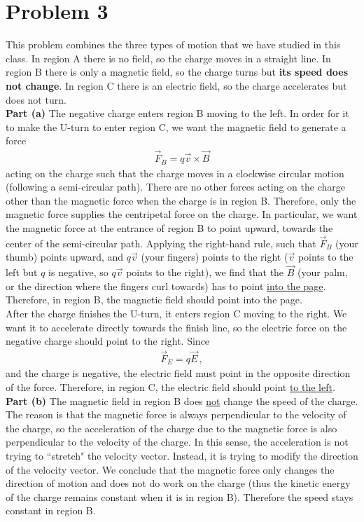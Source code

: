 \documentclass[11pt]{article}
\begin{document}
\newpage
\section*{Problem 3}
This problem combines the three types of motion that we have studied in this class. In region A there is no field, so the charge moves in a straight line. In region B there is only a magnetic field, so the charge turns but \textbf{its speed does not change}. In region C there is an electric field, so the charge accelerates but does not turn.\\

\noindent\textbf{Part (a)} The negative charge enters region B moving to the left. In order for it to make the U-turn to enter region C, we want the magnetic field to generate a force 
\begin{align*}
\vec{F}_B = q\vec{v}\times \vec{B}
\end{align*}
acting on the charge such that the charge moves in a clockwise circular motion (following a semi-circular path). There are no other forces acting on the charge other than the magnetic force when the charge is in region B. Therefore, only the magnetic force supplies the centripetal force on the charge. In particular, we want the magnetic force at the entrance of region B to point upward, towards the center of the semi-circular path. Applying the right-hand rule, such that $\vec{F}_B$ (your thumb) points upward, and $q\vec{v}$ (your fingers) points to the right ($\vec{v}$ points to the left but $q$ is negative, so $q\vec{v}$ points to the right), we find that the $\vec{B}$ (your palm, or the direction where the fingers curl towards) has to point \underline{into the page}. Therefore, in region B, the magnetic field should point into the page.\\

After the charge finishes the U-turn, it enters region C moving to the right. We want it to accelerate directly towards the finish line, so the electric force on the negative charge should point to the right. Since
\begin{align*}
\vec{F}_E = q\vec{E}\,,
\end{align*}
and the charge is negative, the electric field must point in the opposite direction of the force. Therefore, in region C, the electric field should point \underline{to the left}.\\

\noindent\textbf{Part (b)} The magnetic field in region B does \underline{not} change the speed of the charge. The reason is that the magnetic force is always perpendicular to the velocity of the charge, so the acceleration of the charge due to the magnetic force is also perpendicular to the velocity of the charge. In this sense, the acceleration is not trying to ``stretch" the velocity vector. Instead, it is trying to modify the direction of the velocity vector. We conclude that the magnetic force only changes the direction of motion and does not do work on the charge (thus the kinetic energy of the charge remains constant when it is in region B). Therefore the speed stays constant in region B.\\
\end{document}

